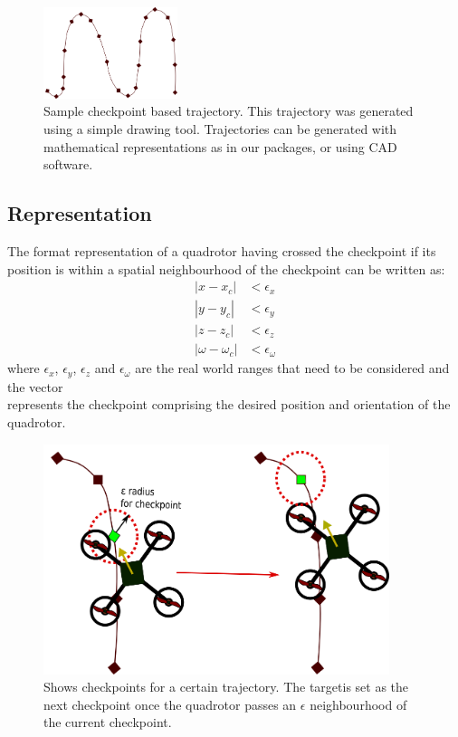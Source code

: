 \documentclass[hidelinks,BTech]{iitmdiss}
\begin{document}
\begin{figure}[H]
  \centering
    \includegraphics[width=0.35\textwidth]{trajectory.png}
    \caption{Sample checkpoint based trajectory. This trajectory was generated using a simple drawing tool. Trajectories can be generated with mathematical representations as in our packages, or using CAD software.}
\end{figure}

\subsection*{Representation}
The format representation of a quadrotor having crossed the checkpoint if its position is within a spatial neighbourhood of the checkpoint can be written as:
\begin{equation} \begin{split}
  |x - x_c| &< \epsilon_x \\
  |y - y_c| &< \epsilon_y \\
  |z - z_c| &< \epsilon_z \\
  |\omega - \omega_c| &< \epsilon_\omega
\end{split} \end{equation}
where $\epsilon_x$, $\epsilon_y$, $\epsilon_z$ and $\epsilon_\omega$ are the real world ranges that need to be considered and the vector
\begin{equation}
  [x_c, y_c, z_y, \omega_c]
\end{equation}
represents the checkpoint comprising the desired position and orientation of the quadrotor.

\begin{figure}[H]
  \centering
    \includegraphics[width=0.9\textwidth]{Checkpoint_trajectory.png}
     \caption{Shows checkpoints for a certain trajectory. The targetis set as the next checkpoint once the quadrotor passes an $\epsilon$ neighbourhood of the current checkpoint.}
\end{figure}
\end{document}
